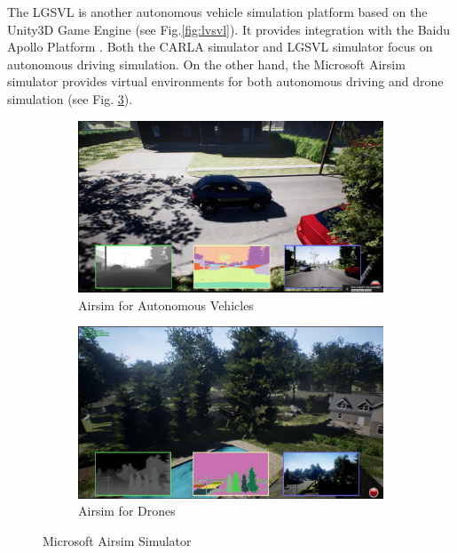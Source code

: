 The LGSVL is another autonomous vehicle simulation platform based on the Unity3D Game Engine (see Fig.\ref{fig:lvsvl}). It provides integration with the Baidu Apollo Platform \citep{rong2020lgsvl}. Both the CARLA simulator and LGSVL simulator focus on autonomous driving simulation. On the other hand, the Microsoft Airsim simulator provides virtual environments for both autonomous driving and drone simulation \citep{airsim2017fsr} (see Fig. \ref{fig.airsim}).

\begin{figure}[H]
\centering
\begin{subfigure}[b]{0.49\textwidth}
    \centering
    \includegraphics[width=\textwidth]{figures/chapter_intro/airsim_car.jpg}
    \caption{Airsim for Autonomous Vehicles}
    \label{fig:airsim_car}
\end{subfigure}
\hfill
\begin{subfigure}[b]{0.49\textwidth}
    \centering
    \includegraphics[width=\textwidth]{figures/chapter_intro/airsim_drone.jpg}
    \caption{Airsim for Drones}
    \label{fig:airsim_drone}
\end{subfigure}
\hfill
\caption{Microsoft Airsim Simulator \citep{airsim2017fsr}}
\label{fig.airsim}
\end{figure}


